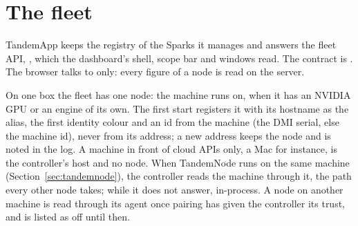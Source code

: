 \section{The fleet}\label{sec:fleet}

TandemApp keeps the registry of the Sparks it manages and answers the fleet API, , which the dashboard's shell, scope bar and windows read. The contract is . The browser talks to  only: every figure of a node is read on the server.

On one box the fleet has one node: the machine  runs on, when it has an NVIDIA GPU or an engine of its own. The first start registers it with its hostname as the alias, the first identity colour and an id from the machine (the DMI serial, else the machine id), never from its address; a new address keeps the node and is noted in the log. A machine in front of cloud APIs only, a Mac for instance, is the controller's host and no node. When TandemNode runs on the same machine (Section~\ref{sec:tandemnode}), the controller reads the machine through it, the path every other node takes; while it does not answer, in-process. A node on another machine is read through its agent once pairing has given the controller its trust, and is listed as off until then.

